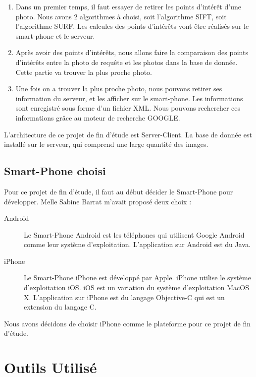\begin{enumerate}
	\item Dans un premier temps, il faut essayer de retirer les points d'intérêt d'une photo. Nous avons 2 algorithmes à choisi, soit l'algorithme SIFT, soit l'algorithme SURF. Les calcules des points d'intérêts vont être réalisés sur le smart-phone et le serveur. 
	\item Après avoir des points d'intérêts, nous allons faire la comparaison des points d'intérêts entre la photo de requête et les photos dans la base de donnée. Cette partie va trouver la plus proche photo.
	\item Une fois on a trouver la plus proche photo, nous pouvons retirer ses information du serveur, et les afficher sur le smart-phone. Les informations sont enregistré sous forme d'un fichier XML. Nous pouvons rechercher ces informations grâce au moteur de recherche GOOGLE.
\end{enumerate}

L'architecture de ce projet de fin d'étude est Server-Client. La base de donnée est installé sur le serveur, qui comprend une large quantité des images. 

\subsection{Smart-Phone choisi} %
\label{sub:smart_phone_choisi}

Pour ce projet de fin d'étude, il faut au début décider le Smart-Phone pour développer. Melle Sabine Barrat m'avait proposé deux choix :
\begin{description}
	\item[Android] Le Smart-Phone Android est les téléphones qui utilisent Google Android comme leur système d'exploitation. L'application sur Android est du  Java.
	\item[iPhone] Le Smart-Phone iPhone est développé par Apple. iPhone utilise le système d'exploitation iOS. iOS est un variation du système d'exploitation MacOS X. L'application sur iPhone est du langage Objective-C qui est un extension du langage C. 
\end{description}

Nous avons décidons de choisir iPhone comme le plateforme pour ce projet de fin d'étude. 

\section{Outils Utilisé} %
\label{sec:bilan_personnel}

